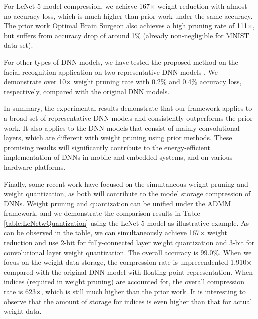 \documentclass{article} %
\begin{document}
For LeNet-5 model compression, we achieve 167$\times$ weight reduction with almost no accuracy loss, which is much higher than prior work under the same accuracy. The prior work Optimal Brain Surgeon \citep{dong2017learning} also achieves a high pruning rate of 111$\times$, but suffers from accuracy drop of around 1\% (already non-negligible for MNIST data set).

For other types of DNN models, we have tested the proposed method on the facial recognition application on two representative DNN models \citep{cvpr2016_gazecapture,JostineHo2016}. We demonstrate over 10$\times$ weight pruning rate with 0.2\% and 0.4\% accuracy loss, respectively, compared with the original DNN models.

In summary, the experimental results demonstrate that our framework applies to a broad set of representative DNN models and consistently outperforms the prior work. It also applies to the DNN models that consist of mainly convolutional layers, which are different with weight pruning using prior methods. These promising results will significantly contribute to the energy-efficient implementation of DNNs in mobile and embedded systems, and on various hardware platforms.

Finally, some recent work have focused on the simultaneous weight pruning and weight quantization, as both will contribute to the model storage compression of DNNs. Weight pruning and quantization can be unified under the ADMM framework, and we demonstrate the comparison results in Table \ref{table:LeNetwQuantization} using the LeNet-5 model as illustrative example. As can be observed in the table, we can simultaneously achieve 167$\times$ weight reduction and use 2-bit for fully-connected layer weight quantization and 3-bit for convolutional layer weight quantization. The overall accuracy is 99.0\%. When we focus on the weight data storage, the compression rate is unprecendented 1,910$\times$ compared with the original DNN model with floating point representation. When indices (required in weight pruning) are accounted for, the overall compression rate is 623$\times$, which is still much higher than the prior work. It is interesting to observe that the amount of storage for indices is even higher than that for actual weight data.
\end{document}
